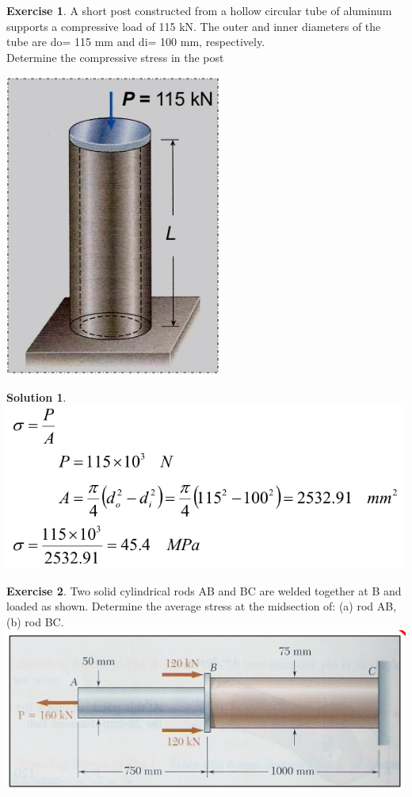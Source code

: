 \documentclass[11pt]{article}
\theoremstyle{definition}
\newtheorem{exer}{Exercise}
\newtheorem{sln}{Solution}
\begin{document}
\begin{exer}
A short post constructed from a hollow circular 
tube of aluminum supports a compressive load 
of 115 kN. The outer and inner diameters of 
the tube are do= 115 mm and di= 100 mm, 
respectively.\\
Determine the compressive stress in the post 

\includegraphics[scale=0.5]{figures/2021-03-30_22-24.png} 
\end{exer}
\begin{sln}
\includegraphics[scale=0.5]{figures/2021-03-30_22-38.png}
\end{sln}
\begin{exer}
Two solid cylindrical rods AB and BC 
are welded together at B and loaded 
as shown. Determine the average 
stress at the midsection of: (a) rod 
AB, (b) rod BC.
\includegraphics[scale=0.5]{figures/2021-03-30_22-37.png}
\end{exer}
\end{document}
